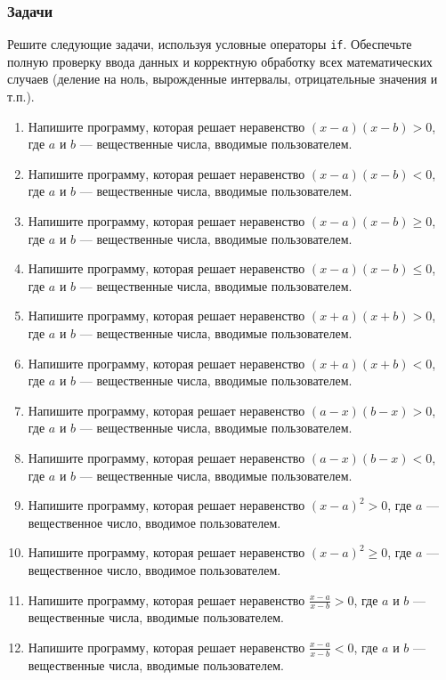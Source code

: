 \documentclass[12pt]{article}
\begin{document}
\subsubsection*{Задачи}

Решите следующие задачи, используя условные операторы \texttt{if}. 
Обеспечьте полную проверку ввода данных и корректную обработку 
всех математических случаев (деление на ноль, вырожденные интервалы, 
отрицательные значения и т.п.).

\begin{enumerate}
    \item Напишите программу, которая решает неравенство $(x - a)(x - b) > 0$, где $a$ и $b$ — вещественные числа, вводимые пользователем.
    \item Напишите программу, которая решает неравенство $(x - a)(x - b) < 0$, где $a$ и $b$ — вещественные числа, вводимые пользователем.
    \item Напишите программу, которая решает неравенство $(x - a)(x - b) \geqslant 0$, где $a$ и $b$ — вещественные числа, вводимые пользователем.
    \item Напишите программу, которая решает неравенство $(x - a)(x - b) \leqslant 0$, где $a$ и $b$ — вещественные числа, вводимые пользователем.
    \item Напишите программу, которая решает неравенство $(x + a)(x + b) > 0$, где $a$ и $b$ — вещественные числа, вводимые пользователем.
    \item Напишите программу, которая решает неравенство $(x + a)(x + b) < 0$, где $a$ и $b$ — вещественные числа, вводимые пользователем.
    \item Напишите программу, которая решает неравенство $(a - x)(b - x) > 0$, где $a$ и $b$ — вещественные числа, вводимые пользователем.
    \item Напишите программу, которая решает неравенство $(a - x)(b - x) < 0$, где $a$ и $b$ — вещественные числа, вводимые пользователем.
    \item Напишите программу, которая решает неравенство $(x - a)^2 > 0$, где $a$ — вещественное число, вводимое пользователем.
    \item Напишите программу, которая решает неравенство $(x - a)^2 \geqslant 0$, где $a$ — вещественное число, вводимое пользователем.
    \item Напишите программу, которая решает неравенство $\frac{x - a}{x - b} > 0$, где $a$ и $b$ — вещественные числа, вводимые пользователем.
    \item Напишите программу, которая решает неравенство $\frac{x - a}{x - b} < 0$, где $a$ и $b$ — вещественные числа, вводимые пользователем.

\end{enumerate}
\end{document}
